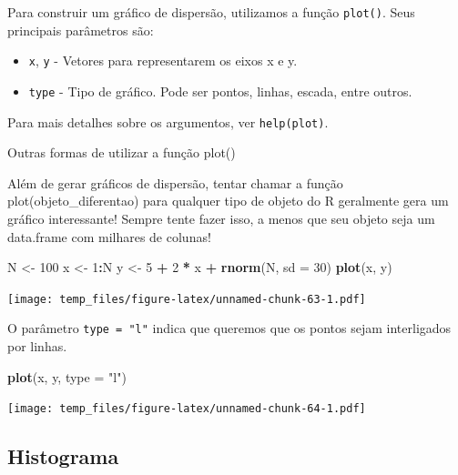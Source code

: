 \documentclass[
]{book}
\newenvironment{Shaded}{\begin{snugshade}}{\end{snugshade}}
\newcommand{\DataTypeTok}[1]{\textcolor[rgb]{0.13,0.29,0.53}{#1}}
\newcommand{\DecValTok}[1]{\textcolor[rgb]{0.00,0.00,0.81}{#1}}
\newcommand{\KeywordTok}[1]{\textcolor[rgb]{0.13,0.29,0.53}{\textbf{#1}}}
\newcommand{\NormalTok}[1]{#1}
\newcommand{\OperatorTok}[1]{\textcolor[rgb]{0.81,0.36,0.00}{\textbf{#1}}}
\newcommand{\StringTok}[1]{\textcolor[rgb]{0.31,0.60,0.02}{#1}}
\providecommand{\tightlist}{%
  \setlength{\itemsep}{0pt}\setlength{\parskip}{0pt}}
\begin{document}
Para construir um gráfico de dispersão, utilizamos a função \texttt{plot()}. Seus principais parâmetros são:

\begin{itemize}
\tightlist
\item
  \texttt{x}, \texttt{y} - Vetores para representarem os eixos x e y.
\item
  \texttt{type} - Tipo de gráfico. Pode ser pontos, linhas, escada, entre outros.
\end{itemize}

Para mais detalhes sobre os argumentos, ver \texttt{help(plot)}.

Outras formas de utilizar a função plot()

Além de gerar gráficos de dispersão, tentar chamar a função plot(objeto\_diferentao) para qualquer tipo de objeto do R geralmente gera um gráfico interessante! Sempre tente fazer isso, a menos que seu objeto seja um data.frame com milhares de colunas!

\begin{Shaded}
\begin{Highlighting}[]
\NormalTok{N <{-}}\StringTok{ }\DecValTok{100}
\NormalTok{x <{-}}\StringTok{ }\DecValTok{1}\OperatorTok{:}\NormalTok{N}
\NormalTok{y <{-}}\StringTok{ }\DecValTok{5} \OperatorTok{+}\StringTok{ }\DecValTok{2} \OperatorTok{*}\StringTok{ }\NormalTok{x }\OperatorTok{+}\StringTok{ }\KeywordTok{rnorm}\NormalTok{(N, }\DataTypeTok{sd =} \DecValTok{30}\NormalTok{)}
\KeywordTok{plot}\NormalTok{(x, y)}
\end{Highlighting}
\end{Shaded}

\texttt{[image: temp\_files/figure-latex/unnamed-chunk-63-1.pdf]}

O parâmetro \texttt{type\ =\ "l"} indica que queremos que os pontos sejam interligados por linhas.

\begin{Shaded}
\begin{Highlighting}[]
\KeywordTok{plot}\NormalTok{(x, y, }\DataTypeTok{type =} \StringTok{"l"}\NormalTok{)}
\end{Highlighting}
\end{Shaded}

\texttt{[image: temp\_files/figure-latex/unnamed-chunk-64-1.pdf]}

\hypertarget{histograma}{%
\subsection{Histograma}\label{histograma}}
\end{document}
